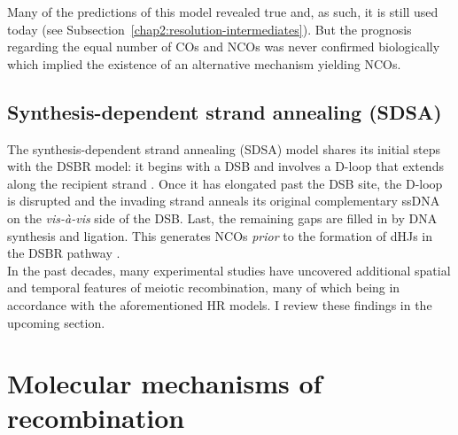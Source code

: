 Many of the predictions of this model revealed true and, as such, it is still used today (see Subsection~\ref{chap2:resolution-intermediates}).
But the prognosis regarding the equal number of COs and NCOs was never confirmed biologically \citep{bishop2004early} which implied the existence of an alternative mechanism yielding NCOs.





\subsection{Synthesis-dependent strand annealing (SDSA)}
\label{chap2:model-SDSA}

The synthesis-dependent strand annealing (SDSA) model \citep{resnick1976repair,nassif1994efficient,ferguson1996recombinational} shares its initial steps with the DSBR model: it begins with a DSB and 
involves a D-loop that extends along the recipient strand \citep[reviewed in][]{mcmahill2007synthesisdependent}.
Once it has elongated past the DSB site, the D-loop is disrupted and the invading strand anneals its original complementary ssDNA on the \textit{vis-\`a-vis} side of the DSB\@.
Last, the remaining gaps are filled in by DNA synthesis and ligation.
This generates NCOs \textit{prior} to the formation of dHJs in the DSBR pathway \citep{allers2001differential}.\\



In the past decades, many experimental studies have uncovered additional spatial and temporal features of meiotic recombination, many of which being in accordance with the aforementioned HR models. 
I review these findings in the upcoming section.













\section{Molecular mechanisms of recombination}

